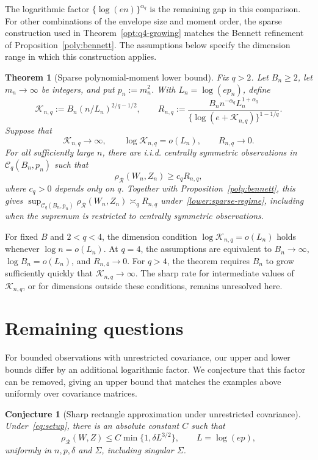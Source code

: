 \documentclass[11pt,letterpaper]{article}
\newtheorem{theorem}{Theorem}
\newtheorem{conjecture}{Conjecture}
\theoremstyle{remark}
\newcommand{\rh}{\rho_{\mathcal R}}
\begin{document}
The logarithmic factor \(\{\log(en)\}^{\alpha_q}\) is the remaining
gap in this comparison.
For other combinations of the envelope size and moment order, the
sparse construction used in Theorem~\ref{opt:q4-growing} matches
the Bennett refinement of Proposition~\ref{poly:bennett}. The assumptions
below specify the dimension range in which this construction applies.

\begin{theorem}[Sparse polynomial-moment lower bound]\label{lower:sparse}
Fix \(q>2\). Let \(B_n\ge2\), let \(m_n\to\infty\) be integers,
and put \(p_n:=m_n^2\). With \(L_n=\log(ep_n)\), define
\[
 \mathcal K_{n,q}:=B_n(n/L_n)^{2/q-1/2},\qquad
 R_{n,q}:=\frac{B_n n^{-\alpha_q}L_n^{1+\alpha_q}}
                    {\{\log(e+\mathcal K_{n,q})\}^{1-1/q}}.
\]
Suppose that
\begin{equation}
 \mathcal K_{n,q}\longrightarrow\infty,\qquad
 \log\mathcal K_{n,q}=o(L_n),\qquad R_{n,q}\longrightarrow0.
 \label{lower:sparse-regime}
\end{equation}
For all sufficiently large \(n\), there are i.i.d. centrally symmetric
observations in \(\mathcal C_q(B_n,p_n)\) such that
\begin{equation}
 \rh(W_n,Z_n)\ge c_qR_{n,q},
 \label{lower:sparse-rate}
\end{equation}
where \(c_q>0\) depends only on \(q\).
Together with Proposition~\ref{poly:bennett}, this gives
\(\sup_{\mathcal C_q(B_n,p_n)}\rh(W_n,Z_n)\asymp_q R_{n,q}\)
under~\eqref{lower:sparse-regime}, including when the supremum is
restricted to centrally symmetric observations.
\end{theorem}

For fixed \(B\) and \(2<q<4\), the dimension condition
\(\log\mathcal K_{n,q}=o(L_n)\) holds whenever
\(\log n=o(L_n)\). At \(q=4\), the assumptions are equivalent to
\(B_n\to\infty\), \(\log B_n=o(L_n)\), and \(R_{n,4}\to0\).
For \(q>4\), the theorem requires \(B_n\) to grow sufficiently quickly
that \(\mathcal K_{n,q}\to\infty\).
The sharp rate for intermediate values of \(\mathcal K_{n,q}\), or
for dimensions outside these conditions, remains unresolved here.

\section{Remaining questions}\label{sec:discussion}

For bounded observations with unrestricted covariance, our upper and
lower bounds differ by an additional logarithmic factor. We conjecture
that this factor can be removed, giving an upper bound that matches
the examples above uniformly over covariance matrices.
\begin{conjecture}[Sharp rectangle approximation under unrestricted covariance]
\label{conj:sharp-unrestricted}
Under~\eqref{eq:setup}, there is an absolute constant \(C\) such that
\[
 \rh(W,Z)\le C\min\{1,\delta L^{3/2}\},\qquad L=\log(ep),
\]
uniformly in \(n,p,\delta\) and \(\Sigma\), including singular \(\Sigma\).
\end{conjecture}
\end{document}
